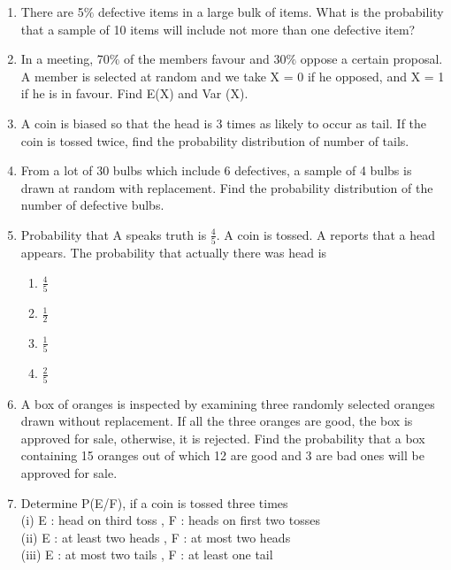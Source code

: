 \begin{enumerate}[label=\thesection.\arabic*.,ref=\thesection.\theenumi]
\item There are 5$\%$ defective items in a large bulk of items. What is the probability
that a sample of 10 items will include not more than one defective item?\\
\solution


\item In a meeting, 70$\%$ of the members favour and 30$\%$ oppose a certain proposal.
A member is selected at random and we take X = 0 if he opposed, and X = 1 if he is in favour. Find E(X) and Var (X).\\
\solution


\item A coin is biased so that the head is 3 times as likely to occur as tail. If the coin is tossed twice, find the probability distribution of number of tails.\\
\item From a lot of 30 bulbs which include 6 defectives, a sample of 4 bulbs is drawn at random with replacement. Find the probability distribution of the number of defective bulbs.\\
\item Probability that A speaks truth is $\frac{4}{5}$. A coin is tossed. A reports that a head appears. The probability that actually there was head is\\
\begin{enumerate}
\item $\frac{4}{5}$
\item $\frac{1}{2}$
\item $\frac{1}{5}$
\item $\frac{2}{5}$
\end{enumerate}
\item A box of oranges is inspected by examining three randomly selected oranges drawn without replacement. If all the three oranges are good, the box is approved for sale, otherwise, it is rejected. Find the probability that a box containing 15 oranges out of which 12 are good and 3 are bad ones will be approved for sale.\\
\solution

%
\item Determine P(E/F), if a coin is tossed three times\\
(i) E : head on third toss , F : heads on first two tosses\\
(ii) E : at least two heads , F : at most two heads\\
(iii) E : at most two tails , F : at least one tail\\
%
\solution



\end{enumerate}
